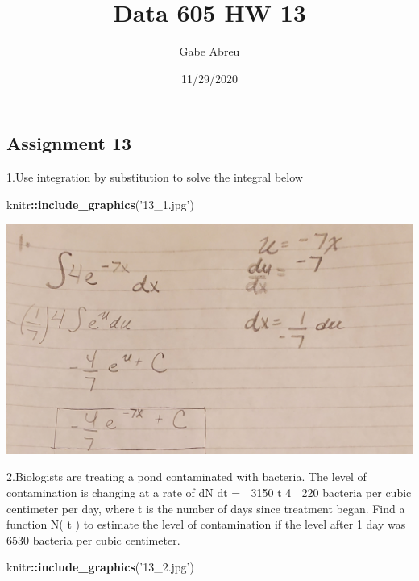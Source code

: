 \documentclass[
]{article}
\title{Data 605 HW 13}
\author{Gabe Abreu}
\date{11/29/2020}
\newenvironment{Shaded}{\begin{snugshade}}{\end{snugshade}}
\newcommand{\KeywordTok}[1]{\textcolor[rgb]{0.13,0.29,0.53}{\textbf{#1}}}
\newcommand{\NormalTok}[1]{#1}
\newcommand{\OperatorTok}[1]{\textcolor[rgb]{0.81,0.36,0.00}{\textbf{#1}}}
\newcommand{\StringTok}[1]{\textcolor[rgb]{0.31,0.60,0.02}{#1}}
\begin{document}
\maketitle

\hypertarget{assignment-13}{%
\subsection{Assignment 13}\label{assignment-13}}

1.Use integration by substitution to solve the integral below

\begin{Shaded}
\begin{Highlighting}[]
\NormalTok{knitr}\OperatorTok{::}\KeywordTok{include_graphics}\NormalTok{(}\StringTok{'13_1.jpg'}\NormalTok{)}
\end{Highlighting}
\end{Shaded}

\includegraphics[width=28.68in]{13_1}

2.Biologists are treating a pond contaminated with bacteria. The level
of contamination is changing at a rate of dN dt =  3150 t 4  220
bacteria per cubic centimeter per day, where t is the number of days
since treatment began. Find a function N( t ) to estimate the level of
contamination if the level after 1 day was 6530 bacteria per cubic
centimeter.

\begin{Shaded}
\begin{Highlighting}[]
\NormalTok{knitr}\OperatorTok{::}\KeywordTok{include_graphics}\NormalTok{(}\StringTok{'13_2.jpg'}\NormalTok{)}
\end{Highlighting}
\end{Shaded}
\end{document}
